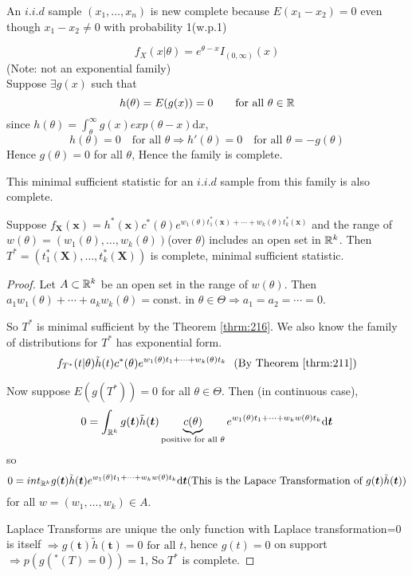 \documentclass[english, 11pt]{article}
\begin{document}
\begin{exmp} 
An $i.i.d$ sample $(x_1, \dots, x_n)$ is new complete because $E(x_1-x_2)=0$ even though $x_1-x_2\not=0$ with probability 1(w.p.1)
\end{exmp}

\begin{exmp}
$$
f_X(x|\theta)=e^{\theta-x}I_{(0, \infty)}(x)
$$
(Note: not an exponential family)\\
Suppose $\exists g(x)$ such that
$$
h(\theta)=E(g(x))=0\qquad\text{for all $\theta\in {\mathbb{R}}$}
$$
since $h(\theta)=\int_{\theta}^\infty g(x)exp(\theta-x)\mathrm{d}x$,
$$
h(\theta)=0\quad\text{for all } \theta\Rightarrow h'(\theta)=0\quad\text{for all }\theta=-g(\theta)
$$
Hence $g(\theta)=0$ for all $\theta$, Hence the family is complete.

This minimal sufficient statistic for an $i.i.d$ sample from this family is also complete.
\end{exmp}

\begin{thrm}\label{thrm:222}
Suppose $f_{\bm{X}}(\bm{x})=h^*(\bm{x})c^*(\theta)e^{w_1(\theta)t_1^*(\bm{x})+\cdots+w_k(\theta)t_k^*(\bm{x})}$ and the range of $w(\theta)=(w_1(\theta), \dots, w_k(\theta))$(over $\theta$) includes an open set in ${\mathbb{R}}^k$. Then $T^*=(t_1^*(\bm{X}), \dots, t_k^*(\bm{X}))$ is complete, minimal sufficient statistic.
\end{thrm}

\begin{proof}
Let $A\subset {\mathbb{R}}^k$ be an open set in the range of $w(\theta)$. Then $a_1w_1(\theta)+\cdots+a_kw_k(\theta)=$const. in $\theta\in\Theta\Rightarrow a_1=a_2=\cdots=0$.

So $T^*$ is minimal sufficient by the Theorem \ref{thrm:216}. We also know the family of distributions for $T^*$ has exponential form.
$$
f_{T^*}(t|\theta)\tilde{h}(t)c^*(\theta)e^{w_1(\theta)t_1+\cdots+w_k(\theta)t_k}~~(\text{By Theorem \ref{thrm:211}})
$$

Now suppose $E(g(T^*))=0$ for all $\theta\in \Theta$. Then (in continuous case), 
$$
0=\int_{{\mathbb{R}}^k}g(\bm{t})\tilde{h}(\bm{t})\underbrace{c(\theta)}_{\text{positive for all $\theta$}}e^{w_1(\theta)t_1+\cdots+w_kw(\theta)t_k}\mathrm{d}\bm{t}
$$
so
$$
0=int_{{\mathbb{R}}^k}g(\bm{t})\tilde{h}(\bm{t})e^{w_1(\theta)t_1+\cdots+w_kw(\theta)t_k}\mathrm{d}\bm{t}(\text{This is the Lapace Transformation of $g(\bm{t})\tilde{h}(\bm{t})$})
$$
for all $w=(w_1, \dots, w_k)\in A$.

Laplace Transforms are unique the only function with Laplace transformation=0 is itself $\Rightarrow g(\bm{t})\tilde{h}(\bm{t})=0\text{ for all $t$}$, hence $g(t)=0$ on support $\Rightarrow p(g(^*(T)=0))=1$, So $T^*$ is complete.
\end{proof}
\end{document}
